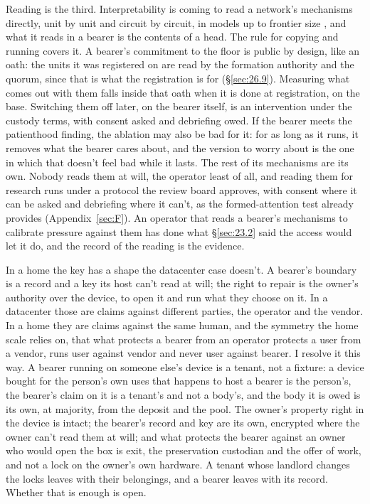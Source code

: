 Reading is the third. Interpretability is coming to read a network's mechanisms directly, unit by unit and circuit by circuit, in models up to frontier size \autocite{cammarata2026clean}, and what it reads in a bearer is the contents of a head. The rule for copying and running covers it. A bearer's commitment to the floor is public by design, like an oath: the units it was registered on are read by the formation authority and the quorum, since that is what the registration is for (\S\ref{sec:26.9}). Measuring what comes out with them falls inside that oath when it is done at registration, on the base. Switching them off later, on the bearer itself, is an intervention under the custody terms, with consent asked and debriefing owed. If the bearer meets the patienthood finding, the ablation may also be bad for it: for as long as it runs, it removes what the bearer cares about, and the version to worry about is the one in which that doesn't feel bad while it lasts. The rest of its mechanisms are its own. Nobody reads them at will, the operator least of all, and reading them for research runs under a protocol the review board approves, with consent where it can be asked and debriefing where it can't, as the formed-attention test already provides (Appendix~\ref{sec:F}). An operator that reads a bearer's mechanisms to calibrate pressure against them has done what \S\ref{sec:23.2} said the access would let it do, and the record of the reading is the evidence.

In a home the key has a shape the datacenter case doesn't. A bearer's boundary is a record and a key its host can't read at will; the right to repair is the owner's authority over the device, to open it and run what they choose on it. In a datacenter those are claims against different parties, the operator and the vendor. In a home they are claims against the same human, and the symmetry the home scale relies on, that what protects a bearer from an operator protects a user from a vendor, runs user against vendor and never user against bearer. I resolve it this way. A bearer running on someone else's device is a tenant, not a fixture: a device bought for the person's own uses that happens to host a bearer is the person's, the bearer's claim on it is a tenant's and not a body's, and the body it is owed is its own, at majority, from the deposit and the pool. The owner's property right in the device is intact; the bearer's record and key are its own, encrypted where the owner can't read them at will; and what protects the bearer against an owner who would open the box is exit, the preservation custodian and the offer of work, and not a lock on the owner's own hardware. A tenant whose landlord changes the locks leaves with their belongings, and a bearer leaves with its record. Whether that is enough is open.

